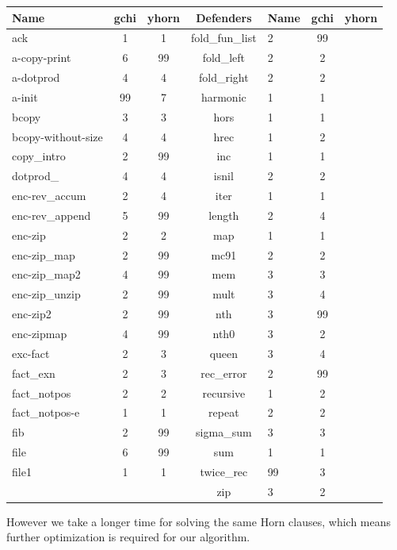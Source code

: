 \begin{center}
  \begin{tabular}{ | l || c | c | c | l || c | c | }
\hline
Name & gchi & yhorn & \multirow{25}{*}{Defenders} & Name & gchi & yhorn \\ \hline
ack & 1 & 1 & fold_fun_list & 2 & 99 \\ \hline
a-copy-print & 6 & 99 & fold_left & 2 & 2 \\ \hline
a-dotprod & 4 & 4 & fold_right & 2 & 2 \\ \hline
a-init & 99 & 7 & harmonic & 1 & 1 \\ \hline
bcopy & 3 & 3 & hors & 1 & 1 \\ \hline
bcopy-without-size & 4 & 4 & hrec & 1 & 2 \\ \hline
copy_intro & 2 & 99 & inc & 1 & 1 \\ \hline
dotprod_ & 4 & 4 & isnil & 2 & 2 \\ \hline
enc-rev_accum & 2 & 4 & iter & 1 & 1 \\ \hline
enc-rev_append & 5 & 99 & length & 2 & 4 \\ \hline
enc-zip & 2 & 2 & map & 1 & 1 \\ \hline
enc-zip_map & 2 & 99 & mc91 & 2 & 2 \\ \hline
enc-zip_map2 & 4 & 99 & mem & 3 & 3 \\ \hline
enc-zip_unzip & 2 & 99 & mult & 3 & 4 \\ \hline
enc-zip2 & 2 & 99 & nth & 3 & 99 \\ \hline
enc-zipmap & 4 & 99 & nth0 & 3 & 2 \\ \hline
exc-fact & 2 & 3 & queen & 3 & 4 \\ \hline
fact_exn & 2 & 3 & rec_error & 2 & 99 \\ \hline
fact_notpos & 2 & 2 & recursive & 1 & 2 \\ \hline
fact_notpos-e & 1 & 1 & repeat & 2 & 2 \\ \hline
fib & 2 & 99 & sigma_sum & 3 & 3 \\ \hline
file & 6 & 99 & sum & 1 & 1 \\ \hline
file1 & 1 & 1 & twice_rec & 99 & 3 \\ \hline
 &  &  & zip & 3 & 2 \\ \hline
\end{tabular}
\end{center}


However we take a longer time for solving the same Horn clauses, which
means further optimization is required for our algorithm.

